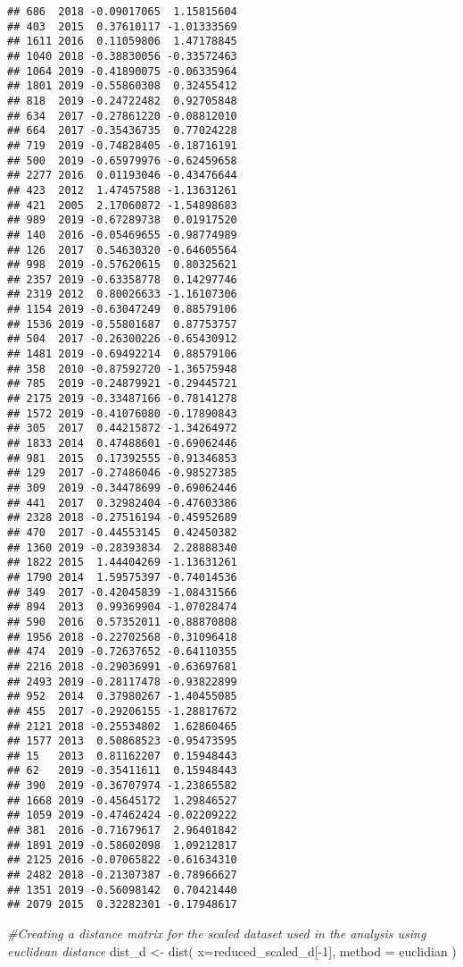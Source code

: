 \documentclass[
]{article}
\newenvironment{Shaded}{\begin{snugshade}}{\end{snugshade}}
\newcommand{\AttributeTok}[1]{\textcolor[rgb]{0.77,0.63,0.00}{#1}}
\newcommand{\CommentTok}[1]{\textcolor[rgb]{0.56,0.35,0.01}{\textit{#1}}}
\newcommand{\DecValTok}[1]{\textcolor[rgb]{0.00,0.00,0.81}{#1}}
\newcommand{\FunctionTok}[1]{\textcolor[rgb]{0.00,0.00,0.00}{#1}}
\newcommand{\NormalTok}[1]{#1}
\newcommand{\OtherTok}[1]{\textcolor[rgb]{0.56,0.35,0.01}{#1}}
\newcommand{\SpecialCharTok}[1]{\textcolor[rgb]{0.00,0.00,0.00}{#1}}
\newcommand{\StringTok}[1]{\textcolor[rgb]{0.31,0.60,0.02}{#1}}
\begin{document}
\begin{verbatim}
## 686  2018 -0.09017065  1.15815604
## 403  2015  0.37610117 -1.01333569
## 1611 2016  0.11059806  1.47178845
## 1040 2018 -0.38830056 -0.33572463
## 1064 2019 -0.41890075 -0.06335964
## 1801 2019 -0.55860308  0.32455412
## 818  2019 -0.24722482  0.92705848
## 634  2017 -0.27861220 -0.08812010
## 664  2017 -0.35436735  0.77024228
## 719  2019 -0.74828405 -0.18716191
## 500  2019 -0.65979976 -0.62459658
## 2277 2016  0.01193046 -0.43476644
## 423  2012  1.47457588 -1.13631261
## 421  2005  2.17060872 -1.54898683
## 989  2019 -0.67289738  0.01917520
## 140  2016 -0.05469655 -0.98774989
## 126  2017  0.54630320 -0.64605564
## 998  2019 -0.57620615  0.80325621
## 2357 2019 -0.63358778  0.14297746
## 2319 2012  0.80026633 -1.16107306
## 1154 2019 -0.63047249  0.88579106
## 1536 2019 -0.55801687  0.87753757
## 504  2017 -0.26300226 -0.65430912
## 1481 2019 -0.69492214  0.88579106
## 358  2010 -0.87592720 -1.36575948
## 785  2019 -0.24879921 -0.29445721
## 2175 2019 -0.33487166 -0.78141278
## 1572 2019 -0.41076080 -0.17890843
## 305  2017  0.44215872 -1.34264972
## 1833 2014  0.47488601 -0.69062446
## 981  2015  0.17392555 -0.91346853
## 129  2017 -0.27486046 -0.98527385
## 309  2019 -0.34478699 -0.69062446
## 441  2017  0.32982404 -0.47603386
## 2328 2018 -0.27516194 -0.45952689
## 470  2017 -0.44553145  0.42450382
## 1360 2019 -0.28393834  2.28888340
## 1822 2015  1.44404269 -1.13631261
## 1790 2014  1.59575397 -0.74014536
## 349  2017 -0.42045839 -1.08431566
## 894  2013  0.99369904 -1.07028474
## 590  2016  0.57352011 -0.88870808
## 1956 2018 -0.22702568 -0.31096418
## 474  2019 -0.72637652 -0.64110355
## 2216 2018 -0.29036991 -0.63697681
## 2493 2019 -0.28117478 -0.93822899
## 952  2014  0.37980267 -1.40455085
## 455  2017 -0.29206155 -1.28817672
## 2121 2018 -0.25534802  1.62860465
## 1577 2013  0.50868523 -0.95473595
## 15   2013  0.81162207  0.15948443
## 62   2019 -0.35411611  0.15948443
## 390  2019 -0.36707974 -1.23865582
## 1668 2019 -0.45645172  1.29846527
## 1059 2019 -0.47462424 -0.02209222
## 381  2016 -0.71679617  2.96401842
## 1891 2019 -0.58602098  1.09212817
## 2125 2016 -0.07065822 -0.61634310
## 2482 2018 -0.21307387 -0.78966627
## 1351 2019 -0.56098142  0.70421440
## 2079 2015  0.32282301 -0.17948617
\end{verbatim}

\begin{Shaded}
\begin{Highlighting}[]
\CommentTok{\#Creating a distance matrix for the scaled dataset used in the analysis using euclidean distance}
\NormalTok{dist\_d }\OtherTok{\textless{}{-}} \FunctionTok{dist}\NormalTok{(}
  \AttributeTok{x=}\NormalTok{reduced\_scaled\_d[}\SpecialCharTok{{-}}\DecValTok{1}\NormalTok{],}
  \AttributeTok{method =} \StringTok{\textquotesingle{}euclidian\textquotesingle{}}
\NormalTok{)}
\end{Highlighting}
\end{Shaded}
\end{document}
